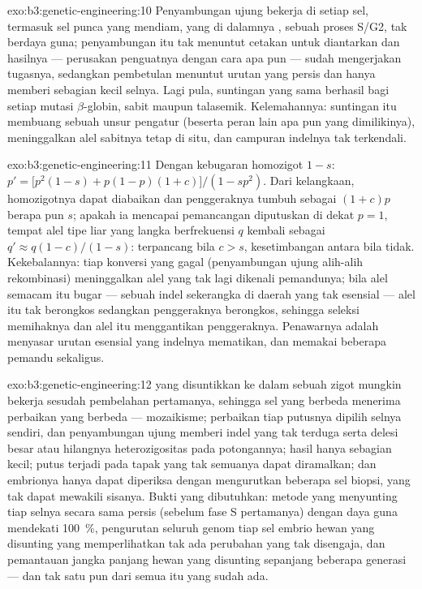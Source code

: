 \begin{solution}{exo:b3:genetic-engineering:10}
Penyambungan ujung bekerja di setiap sel, termasuk sel punca yang mendiam,
yang di dalamnya , sebuah proses S/G2, tak berdaya guna;
penyambungan itu tak menuntut cetakan untuk diantarkan dan hasilnya --- perusakan
penguatnya dengan cara apa pun --- sudah mengerjakan tugasnya, sedangkan
pembetulan menuntut urutan yang persis dan hanya memberi sebagian kecil
selnya. Lagi pula, suntingan yang sama berhasil bagi setiap mutasi
$\beta$-globin, sabit maupun talasemik. Kelemahannya: suntingan itu membuang
sebuah unsur pengatur (beserta peran lain apa pun yang dimilikinya),
meninggalkan alel sabitnya tetap di situ, dan campuran indelnya tak terkendali.
\end{solution}

\begin{solution}{exo:b3:genetic-engineering:11}
Dengan kebugaran homozigot $1 - s$: $p' = \bigl[p^{2}(1-s) + p(1-p)(1+c)
\bigr]/(1 - sp^{2})$. Dari kelangkaan, homozigotnya dapat diabaikan dan
penggeraknya tumbuh sebagai $(1+c)p$ berapa pun $s$; apakah ia mencapai
pemancangan diputuskan di dekat $p = 1$, tempat alel tipe liar yang langka
berfrekuensi $q$ kembali sebagai $q' \approx q(1-c)/(1-s)$: terpancang bila
$c > s$, kesetimbangan antara bila tidak. Kekebalannya: tiap konversi yang
gagal (penyambungan ujung alih-alih rekombinasi) meninggalkan alel yang tak
lagi dikenali pemandunya; bila alel semacam itu bugar --- sebuah indel
sekerangka di daerah yang tak esensial --- alel itu tak berongkos sedangkan
penggeraknya berongkos, sehingga seleksi memihaknya dan alel itu menggantikan
penggeraknya. Penawarnya adalah menyasar urutan esensial yang indelnya
mematikan, dan memakai beberapa pemandu sekaligus.
\end{solution}

\begin{solution}{exo:b3:genetic-engineering:12}
 yang disuntikkan ke dalam sebuah zigot mungkin bekerja sesudah pembelahan
pertamanya, sehingga sel yang berbeda menerima perbaikan yang berbeda ---
mozaikisme; perbaikan tiap putusnya dipilih selnya sendiri, dan penyambungan
ujung memberi indel yang tak terduga serta delesi besar atau hilangnya
heterozigositas pada potongannya; hasil  hanya sebagian
kecil; putus  terjadi pada tapak yang tak semuanya dapat
diramalkan; dan embrionya hanya dapat diperiksa dengan mengurutkan beberapa
sel biopsi, yang tak dapat mewakili sisanya. Bukti yang dibutuhkan: metode
yang menyunting tiap selnya secara sama persis (sebelum fase S pertamanya)
dengan daya guna mendekati \qty{100}{\%}, pengurutan seluruh genom tiap sel
embrio hewan yang disunting yang memperlihatkan tak ada perubahan yang tak
disengaja, dan pemantauan jangka panjang hewan yang disunting sepanjang
beberapa generasi --- dan tak satu pun dari semua itu yang sudah ada.
\end{solution}

